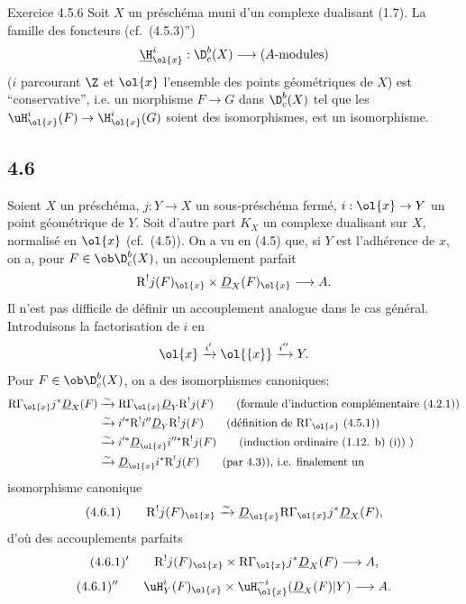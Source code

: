 \begin{statement}{Exercice 4.5.6}
Soit $X$ un préschéma muni d'un complexe dualisant (1.7). La famille des foncteurs (cf.~(4.5.3)'')
\[
\underline{\H}_{\ol{x}}^i:\D_c^b(X)\longrightarrow (A\text{-modules})
\]
($i$ parcourant $\Z$ et $\ol{x}$ l'ensemble des points géométriques de $X$) est 
``conservative'', i.e. un morphisme $F\to G$ dans $\D_c^b(X)$ tel que les $\uH_{\ol{x}}^i(F)\to\H_{\ol{x}}^i(G)$ soient des isomorphismes, est un isomorphisme.
\end{statement}

\subsection*{4.6}
Soient $X$ un préschéma, $j:Y\to X$ un sous-préschéma fermé, $i:\ol{x}\to Y$ un point géométrique de $Y$. Soit d'autre part $K_X$ un complexe dualisant sur $X$, normalisé en $\ol{x}$ (cf.~(4.5)). On a vu en (4.5) que, si $Y$ est l'adhérence de $x$, on a, pour $F\in\ob\D_c^b(X)$, un accouplement parfait
\[
\mathrm{R}^{!}j(F)_{\ol{x}}\times \underline{D}_X(F)_{\ol{x}}\longrightarrow A.
\]
Il n'est pas difficile de définir un accouplement analogue dans le cas général. Introduisons la factorisation de $i$ en
\[
\ol{x}\xrightarrow{i'}\ol{\{x\}}\xrightarrow{i''}Y.
\]
Pour $F\in\ob\D_c^b(X)$, on a des isomorphismes canoniques:
\[
\begin{aligned}
\mathrm{R}\Gamma_{\ol{x}}j^*\underline{D}_X(F)&\xrightarrow{\sim}\mathrm{R}\Gamma_{\ol{x}}\underline{D}_Y\mathrm{R}^{!}j(F)\qquad\text{(formule d'induction complémentaire (4.2.1))}\\
&\xrightarrow{\sim}i'^*\mathrm{R}^{!}i''\underline{D}_Y\mathrm{R}^{!}j(F)\qquad\text{(définition de $\mathrm{R}\Gamma_{\ol{x}}$ (4.5.1))}\\
&\xrightarrow{\sim}i'^*\underline{D}_{\ol{x}}i''^*\mathrm{R}^{!}j(F)\qquad\text{(induction ordinaire (1.12. b) (i)) )}\\
&\xrightarrow{\sim}\underline{D}_{\ol{x}}i^*\mathrm{R}^{!}j(F)\qquad\text{(par 4.3)), i.e. finalement un}
\end{aligned}
\]
isomorphisme canonique
\[
(4.6.1)\qquad \mathrm{R}^{!}j(F)_{\ol{x}}\xrightarrow{\sim}\underline{D}_{\ol{x}}\mathrm{R}\Gamma_{\ol{x}}j^*\underline{D}_X(F),
\]
d'où des accouplements parfaits
\[
(4.6.1)'\qquad \mathrm{R}^{!}j(F)_{\ol{x}}\times \mathrm{R}\Gamma_{\ol{x}}j^*\underline{D}_X(F)\longrightarrow A,
\]
\[
(4.6.1)''\qquad \uH_Y^i(F)_{\ol{x}}\times \uH_{\ol{x}}^{-i}(\underline{D}_X(F)|Y)\longrightarrow A.
\]

